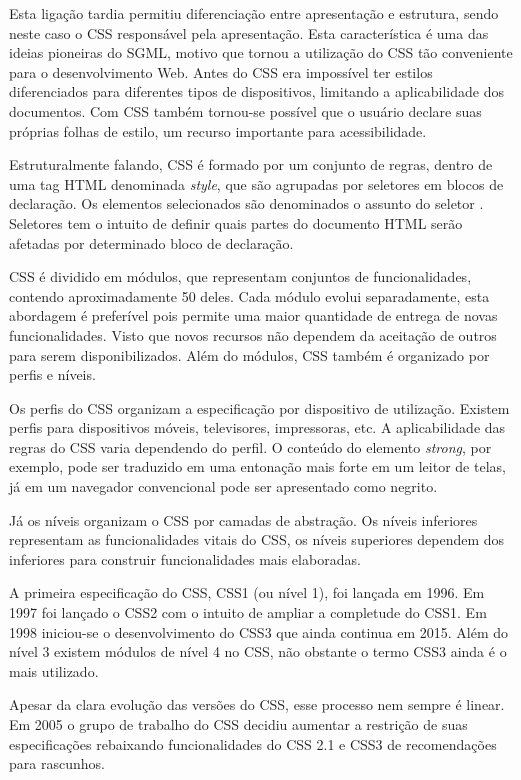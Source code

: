Esta ligação tardia permitiu diferenciação entre apresentação e
estrutura, sendo neste caso o CSS responsável pela apresentação. Esta
característica é uma das ideias pioneiras do SGML, motivo que tornou a
utilização do CSS tão conveniente para o desenvolvimento Web.
Antes do CSS era impossível ter estilos diferenciados para diferentes
tipos de dispositivos, limitando a aplicabilidade dos documentos.
Com CSS também tornou-se possível que o usuário declare suas próprias
folhas de estilo, um recurso importante para acessibilidade.

Estruturalmente falando, CSS é formado por um conjunto de regras,
dentro de uma tag HTML denominada \textit{style}, que são agrupadas
por seletores em blocos de declaração. Os elementos selecionados são
denominados o assunto do seletor \autocite{cssSelectors}. Seletores tem
o intuito de definir quais partes do documento HTML serão afetadas por
determinado bloco de declaração.

CSS é dividido em módulos, que representam conjuntos de
funcionalidades, contendo aproximadamente 50 deles. Cada módulo evolui
separadamente, esta abordagem é preferível pois permite uma maior
quantidade de entrega de novas funcionalidades. Visto que novos recursos
não dependem da aceitação de outros para serem disponibilizados.
Além do módulos, CSS também é organizado por perfis e níveis.

Os perfis do CSS organizam a especificação por dispositivo de
utilização. Existem perfis para dispositivos móveis, televisores,
impressoras, etc. A aplicabilidade das regras do CSS varia dependendo do
perfil. O conteúdo do elemento \textit{strong}, por exemplo, pode ser
traduzido em uma entonação mais forte em um leitor de telas, já em um
navegador convencional pode ser apresentado como negrito.

Já os níveis organizam o CSS por camadas de abstração. Os níveis
inferiores representam as funcionalidades vitais do CSS, os níveis
superiores dependem dos inferiores para construir funcionalidades
mais elaboradas.

A primeira especificação do CSS, CSS1 (ou nível 1), foi lançada em
1996. Em 1997 foi lançado o CSS2 com o intuito de ampliar a completude
do CSS1. Em 1998 iniciou-se o desenvolvimento do CSS3 que ainda continua
em 2015. Além do nível 3 existem módulos de nível 4 no CSS, não
obstante o termo CSS3 ainda é o mais utilizado.

Apesar da clara evolução das versões do CSS, esse processo nem
sempre é linear. Em 2005 o grupo de trabalho do CSS decidiu aumentar a
restrição de suas especificações rebaixando funcionalidades do CSS
2.1 e CSS3 de recomendações para rascunhos.

